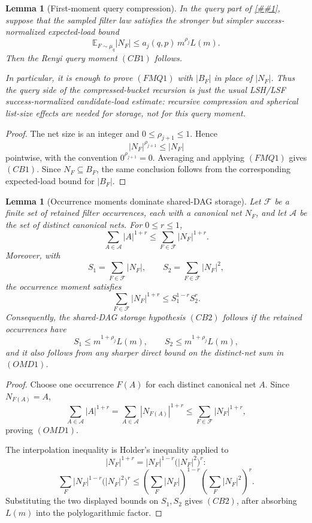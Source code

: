 \documentclass[10pt]{article}
\newcommand{\cref}[1]{\ref{##1}}
\newtheorem{lemma}[theorem]{Lemma}
\theoremstyle{definition}
\newcommand{\E}{\mathbb{E}}
\begin{document}
\begin{lemma}[First-moment query compression]\label{lem:first-moment-query-compression}
   In the query part of \cref{prop:success-normalized-bucket-dag}, suppose
   that the sampled filter law satisfies the stronger but simpler
   success-normalized expected-load bound
   \[
      \E_{F\sim\mu_q}|N_F|
      \le
      a_j(q,p)\,m^{\rho_j}L(m).
      \tag{FMQ1}
   \]
   Then the Renyi query moment \((CB1)\) follows.

   In particular, it is enough to prove \((FMQ1)\) with \(|B_F|\) in place of
   \(|N_F|\).  Thus the query side of the compressed-bucket recursion is just
   the usual LSH/LSF success-normalized candidate-load estimate: recursive
   compression and spherical list-size effects are needed for storage, not for
   this query moment.
\end{lemma}

\begin{proof}
   The net size is an integer and \(0\le\rho_{j+1}\le1\).  Hence
   \[
      |N_F|^{\rho_{j+1}}\le |N_F|
   \]
   pointwise, with the convention \(0^{\rho_{j+1}}=0\).  Averaging and applying
   \((FMQ1)\) gives \((CB1)\).  Since \(N_F\subseteq B_F\), the same conclusion
   follows from the corresponding expected-load bound for \(|B_F|\).
\end{proof}

\begin{lemma}[Occurrence moments dominate shared-DAG storage]
   \label{lem:occurrence-moments-dominate-dag}
   Let \(\mathcal F\) be a finite set of retained filter occurrences, each with
   a canonical net \(N_F\), and let \(\mathcal A\) be the set of distinct
   canonical nets.  For \(0\le r\le1\),
   \[
      \sum_{A\in\mathcal A}|A|^{1+r}
      \le
      \sum_{F\in\mathcal F}|N_F|^{1+r}.
      \tag{OMD1}
   \]
   Moreover, with
   \[
      S_1=\sum_{F\in\mathcal F}|N_F|,
      \qquad
      S_2=\sum_{F\in\mathcal F}|N_F|^2,
   \]
   the occurrence moment satisfies
   \[
      \sum_{F\in\mathcal F}|N_F|^{1+r}
      \le
      S_1^{1-r}S_2^r .
      \tag{OMD2}
   \]
   Consequently, the shared-DAG storage hypothesis \((CB2)\) follows if the
   retained occurrences have
   \[
      S_1\le m^{1+\rho_j}L(m),
      \qquad
      S_2\le m^{1+\rho_j}L(m),
   \]
   and it also follows from any sharper direct bound on the distinct-net sum in
   \((OMD1)\).
\end{lemma}

\begin{proof}
   Choose one occurrence \(F(A)\) for each distinct canonical net \(A\).  Since
   \(N_{F(A)}=A\),
   \[
      \sum_{A\in\mathcal A}|A|^{1+r}
      =
      \sum_{A\in\mathcal A}|N_{F(A)}|^{1+r}
      \le
      \sum_{F\in\mathcal F}|N_F|^{1+r},
   \]
   proving \((OMD1)\).

   The interpolation inequality is Holder's inequality applied to
   \[
      |N_F|^{1+r}=|N_F|^{1-r}\bigl(|N_F|^2\bigr)^r:
   \]
   \[
      \sum_F |N_F|^{1-r}\bigl(|N_F|^2\bigr)^r
      \le
      \left(\sum_F |N_F|\right)^{1-r}
      \left(\sum_F |N_F|^2\right)^r .
   \]
   Substituting the two displayed bounds on \(S_1,S_2\) gives \((CB2)\), after
   absorbing \(L(m)\) into the polylogarithmic factor.
\end{proof}
\end{document}
